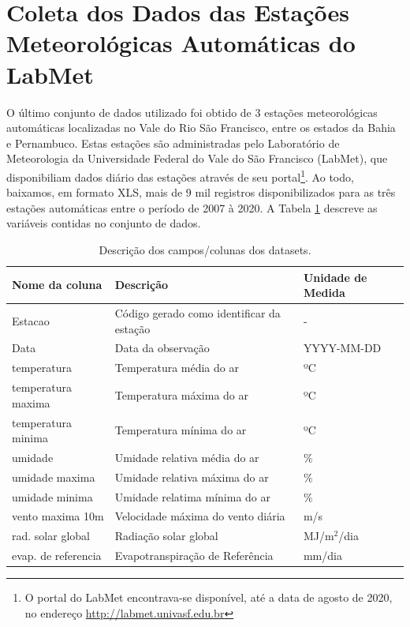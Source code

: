 \section{Coleta dos Dados das Estações Meteorológicas Automáticas do LabMet}

O último conjunto de dados utilizado foi obtido de 3 estações meteorológicas automáticas localizadas no Vale do Rio São Francisco, entre os estados da Bahia e Pernambuco. Estas estações são administradas pelo Laboratório de Meteorologia da Universidade Federal do Vale do São Francisco (LabMet), que disponibiliam dados diário das estações através de seu portal\footnote{O portal do LabMet encontrava-se disponível, até a data de agosto de 2020, no endereço \href{http://labmet.univasf.edu.br}{http://labmet.univasf.edu.br}}. Ao todo, baixamos, em formato XLS, mais de 9 mil registros disponibilizados para as três estações automáticas entre o período de 2007 à 2020. A Tabela \ref{tab:estacoes_automaticas_labmet} descreve as variáveis contidas no conjunto de dados. 

\begin{table}[h!]
\caption{Descrição dos campos/colunas dos datasets.}
\label{tab:estacoes_automaticas_labmet}
\begin{tabular}{|l|l|l|}
\hline
\textbf{Nome da coluna} & \textbf{Descrição} & \textbf{Unidade de Medida}\\
\hline
Estacao & Código gerado como identificar da estação & - \\
\hline
Data & Data da observação & YYYY-MM-DD\\
\hline
temperatura & Temperatura média do ar & ºC\\
\hline
temperatura maxima & Temperatura máxima do ar & ºC\\
\hline
temperatura minima & Temperatura mínima do ar & ºC\\
\hline
umidade & Umidade relativa média do ar & \% \\
\hline
umidade maxima & Umidade relativa máxima do ar & \% \\
\hline
umidade minima & Umidade relatima mínima do ar & \% \\
\hline
vento maxima 10m & Velocidade máxima do vento diária  & m/s \\
\hline
rad. solar global & Radiação solar global  & MJ/m$^2$/dia\\
\hline
evap. de referencia & Evapotranspiração de Referência & mm/dia\\
\hline
\end{tabular}
\end{table}

\renewcommand{\cleardoublepage}{}
\renewcommand{\clearpage}{}
\vspace{5mm}